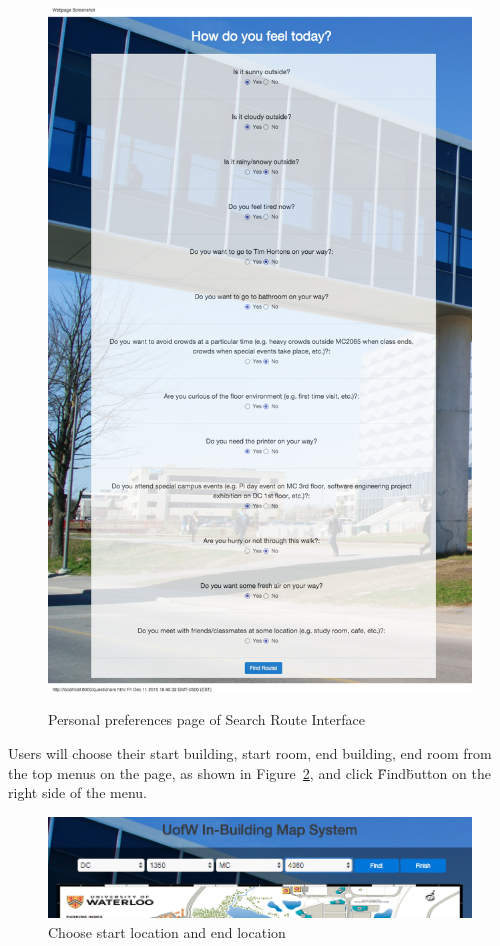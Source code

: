 \documentclass{sigchi}
\begin{document}
\begin{figure}[!h]
\centering
\includegraphics[width=1.0\columnwidth]{pics/personal_page_1.png}
\label{fig:personal_page_1}
\caption{Personal preferences page of Search Route Interface}
\end{figure}


Users will choose their start building, start room, end building, end room from the top menus on the page, as shown in Figure~\ref{fig:choose_page_1}, and click \"Find\" button on the right side of the menu.

\begin{figure}[!h]
\centering
\includegraphics[width=1.0\columnwidth]{pics/choose_page_1.png}
\caption{Choose start location and end location}
\label{fig:choose_page_1}
\end{figure}
\end{document}
